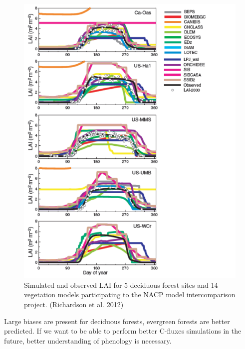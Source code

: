 \documentclass[
  12pt,
  oneside]{book}
\begin{document}
\begin{figure}

{\centering \includegraphics[width=0.8\linewidth]{figures/chap4/f47_LAI_richardson} 

}

\caption{Simulated and observed LAI for 5 deciduous forest sites and 14 vegetation models participating to the NACP model intercomparison project. (Richardson et al. 2012)}\label{fig:f49}
\end{figure}

Large biases are present for deciduous forests, evergreen forests are better predicted. If we want to be able to perform better C-fluxes simulations in the future, better understanding of phenology is necessary.
\end{document}
